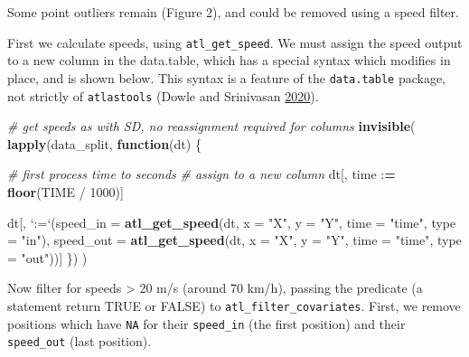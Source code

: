 \documentclass[]{scrartcl}
\newenvironment{Shaded}{}{}
\newcommand{\CommentTok}[1]{\textcolor[rgb]{0.38,0.63,0.69}{\textit{#1}}}
\newcommand{\ControlFlowTok}[1]{\textcolor[rgb]{0.00,0.44,0.13}{\textbf{#1}}}
\newcommand{\DataTypeTok}[1]{\textcolor[rgb]{0.56,0.13,0.00}{#1}}
\newcommand{\DecValTok}[1]{\textcolor[rgb]{0.25,0.63,0.44}{#1}}
\newcommand{\ErrorTok}[1]{\textcolor[rgb]{1.00,0.00,0.00}{\textbf{#1}}}
\newcommand{\KeywordTok}[1]{\textcolor[rgb]{0.00,0.44,0.13}{\textbf{#1}}}
\newcommand{\NormalTok}[1]{#1}
\newcommand{\OperatorTok}[1]{\textcolor[rgb]{0.40,0.40,0.40}{#1}}
\newcommand{\StringTok}[1]{\textcolor[rgb]{0.25,0.44,0.63}{#1}}
\begin{document}
Some point outliers remain (Figure 2), and could be removed using a speed filter.

First we calculate speeds, using \texttt{atl\_get\_speed}. We must assign the speed output to a new column in the data.table, which has a special syntax which modifies in place, and is shown below. This syntax is a feature of the \texttt{data.table} package, not strictly of \texttt{atlastools} (Dowle and Srinivasan \protect\hyperlink{ref-dowle2020}{2020}).

\begin{Shaded}
\begin{Highlighting}[]
\CommentTok{# get speeds as with SD, no reassignment required for columns}
\KeywordTok{invisible}\NormalTok{(}
  \KeywordTok{lapply}\NormalTok{(data_split, }\ControlFlowTok{function}\NormalTok{(dt) \{}
    
    \CommentTok{# first process time to seconds}
    \CommentTok{# assign to a new column}
\NormalTok{    dt[, time }\OperatorTok{:}\ErrorTok{=}\StringTok{ }\KeywordTok{floor}\NormalTok{(TIME }\OperatorTok{/}\StringTok{ }\DecValTok{1000}\NormalTok{)]}
    
\NormalTok{    dt[, }\StringTok{`}\DataTypeTok{:=}\StringTok{`}\NormalTok{(}\DataTypeTok{speed_in =} \KeywordTok{atl_get_speed}\NormalTok{(dt, }
                                       \DataTypeTok{x =} \StringTok{"X"}\NormalTok{, }\DataTypeTok{y =} \StringTok{"Y"}\NormalTok{, }
                                       \DataTypeTok{time =} \StringTok{"time"}\NormalTok{,}
                                       \DataTypeTok{type =} \StringTok{"in"}\NormalTok{),}
              \DataTypeTok{speed_out =} \KeywordTok{atl_get_speed}\NormalTok{(dt, }
                                       \DataTypeTok{x =} \StringTok{"X"}\NormalTok{, }\DataTypeTok{y =} \StringTok{"Y"}\NormalTok{, }
                                       \DataTypeTok{time =} \StringTok{"time"}\NormalTok{,}
                                       \DataTypeTok{type =} \StringTok{"out"}\NormalTok{))]}
\NormalTok{  \})}
\NormalTok{)}
\end{Highlighting}
\end{Shaded}

Now filter for speeds \textgreater{} 20 m/s (around 70 km/h), passing the predicate (a statement return TRUE or FALSE) to \texttt{atl\_filter\_covariates}. First, we remove positions which have \texttt{NA} for their \texttt{speed\_in} (the first position) and their \texttt{speed\_out} (last position).
\end{document}
